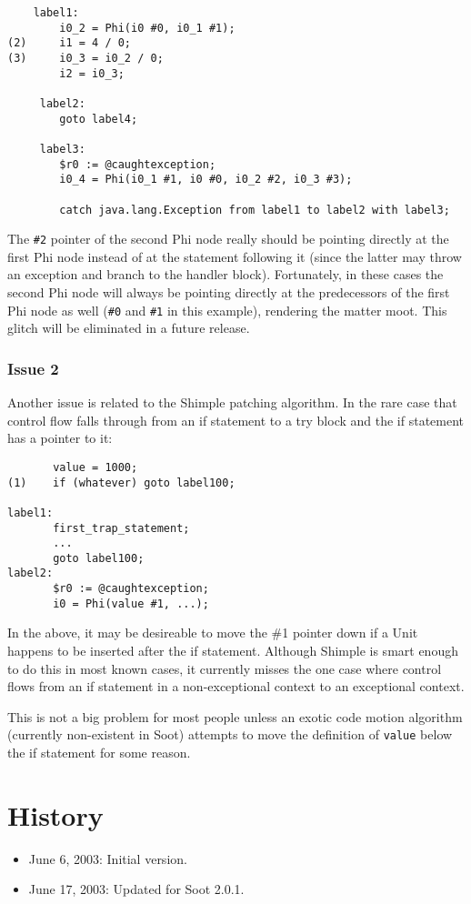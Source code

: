 \documentclass[10pt,letterpaper,oneside,onecolumn]{article}
\begin{document}
\begin{verbatim}
    label1:
        i0_2 = Phi(i0 #0, i0_1 #1);
(2)     i1 = 4 / 0;
(3)     i0_3 = i0_2 / 0;
        i2 = i0_3;

     label2:
        goto label4;

     label3:
        $r0 := @caughtexception;
        i0_4 = Phi(i0_1 #1, i0 #0, i0_2 #2, i0_3 #3);

        catch java.lang.Exception from label1 to label2 with label3;
\end{verbatim}

The {\tt \#2} pointer of the second Phi node really should be pointing
directly at the first Phi node instead of at the statement following
it (since the latter may throw an exception and branch to the handler
block).  Fortunately, in these cases the second Phi node will always
be pointing directly at the predecessors of the first Phi node as well
({\tt \#0} and {\tt \#1} in this example), rendering the matter moot.
This glitch will be eliminated in a future release.

\subsubsection{Issue 2}

Another issue is related to the Shimple patching algorithm.  In the
rare case that control flow falls through from an if statement to a
try block and the if statement has a pointer to it:

\begin{verbatim}
       value = 1000;
(1)    if (whatever) goto label100;

label1:
       first_trap_statement;
       ...
       goto label100;
label2:
       $r0 := @caughtexception;
       i0 = Phi(value #1, ...);
\end{verbatim}

In the above, it may be desireable to move the \#1 pointer down if a
Unit happens to be inserted after the if statement.  Although Shimple
is smart enough to do this in most known cases, it currently misses
the one case where control flows from an if statement in a
non-exceptional context to an exceptional context.

This is not a big problem for most people unless an exotic code motion
algorithm (currently non-existent in Soot) attempts to move the
definition of {\tt value} below the if statement for some reason.

\section*{History}
\begin{itemize}
\item June 6, 2003: Initial version.
\item June 17, 2003: Updated for Soot 2.0.1.
\end{itemize}
\end{document}
